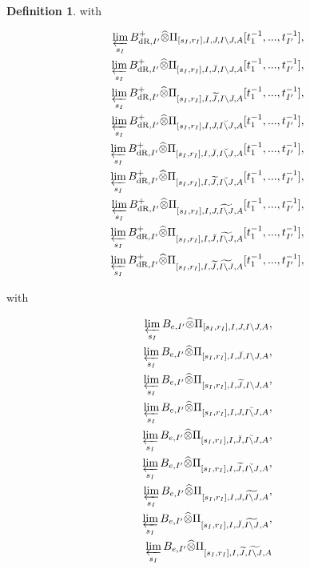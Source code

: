 \documentclass[12pt]{amsart}
\theoremstyle{definition}
\newtheorem{definition}[theorem]{Definition}
\numberwithin{equation}{section}
\begin{document}
\begin{definition}
with

\begin{align}
\varprojlim_{s_I} B^+_{\mathrm{dR},I'}	\widehat{\otimes}\Pi_{[s_I,r_I],I,J,I\backslash J,A}[t_1^{-1},...,t_{I'}^{-1}],\\	
\varprojlim_{s_I} B^+_{\mathrm{dR},I'}	\widehat{\otimes}\Pi_{[s_I,r_I],I,\breve{J},I\backslash J,A}[t_1^{-1},...,t_{I'}^{-1}],\\	
\varprojlim_{s_I} B^+_{\mathrm{dR},I'}	\widehat{\otimes}\Pi_{[s_I,r_I],I,\widetilde{J},I\backslash J,A}[t_1^{-1},...,t_{I'}^{-1}],\\
\varprojlim_{s_I} B^+_{\mathrm{dR},I'}	\widehat{\otimes}\Pi_{[s_I,r_I],I,J,\breve{I\backslash J},A}[t_1^{-1},...,t_{I'}^{-1}],\\	
\varprojlim_{s_I} B^+_{\mathrm{dR},I'}	\widehat{\otimes}\Pi_{[s_I,r_I],I,\breve{J},\breve{I\backslash J},A}[t_1^{-1},...,t_{I'}^{-1}],\\
\varprojlim_{s_I} B^+_{\mathrm{dR},I'}	\widehat{\otimes}\Pi_{[s_I,r_I],I,\widetilde{J},\breve{I\backslash J},A}[t_1^{-1},...,t_{I'}^{-1}],\\
\varprojlim_{s_I} B^+_{\mathrm{dR},I'}	\widehat{\otimes}\Pi_{[s_I,r_I],I,J,\widetilde{I\backslash J},A}[t_1^{-1},...,t_{I'}^{-1}],\\	
\varprojlim_{s_I} B^+_{\mathrm{dR},I'}	\widehat{\otimes}\Pi_{[s_I,r_I],I,\breve{J},\widetilde{I\backslash J},A}[t_1^{-1},...,t_{I'}^{-1}],\\
\varprojlim_{s_I} B^+_{\mathrm{dR},I'}	\widehat{\otimes}\Pi_{[s_I,r_I],I,\widetilde{J},\widetilde{I\backslash J},A}[t_1^{-1},...,t_{I'}^{-1}],
\end{align}

with 

\begin{align}
\varprojlim_{s_I} B_{e,I'}	\widehat{\otimes}\Pi_{[s_I,r_I],I,J,I\backslash J,A},\\	
\varprojlim_{s_I} B_{e,I'}	\widehat{\otimes}\Pi_{[s_I,r_I],I,\breve{J},I\backslash J,A},\\	
\varprojlim_{s_I} B_{e,I'}	\widehat{\otimes}\Pi_{[s_I,r_I],I,\widetilde{J},I\backslash J,A},\\
\varprojlim_{s_I} B_{e,I'}	\widehat{\otimes}\Pi_{[s_I,r_I],I,J,\breve{I\backslash J},A},\\	
\varprojlim_{s_I} B_{e,I'}	\widehat{\otimes}\Pi_{[s_I,r_I],I,\breve{J},\breve{I\backslash J},A},\\
\varprojlim_{s_I} B_{e,I'}	\widehat{\otimes}\Pi_{[s_I,r_I],I,\widetilde{J},\breve{I\backslash J},A},\\
\varprojlim_{s_I} B_{e,I'}	\widehat{\otimes}\Pi_{[s_I,r_I],I,J,\widetilde{I\backslash J},A},\\	
\varprojlim_{s_I} B_{e,I'}	\widehat{\otimes}\Pi_{[s_I,r_I],I,\breve{J},\widetilde{I\backslash J},A},\\
\varprojlim_{s_I} B_{e,I'} \widehat{\otimes}\Pi_{[s_I,r_I],I,\widetilde{J},\widetilde{I\backslash J},A}
\end{align}


\end{definition}
\end{document}
